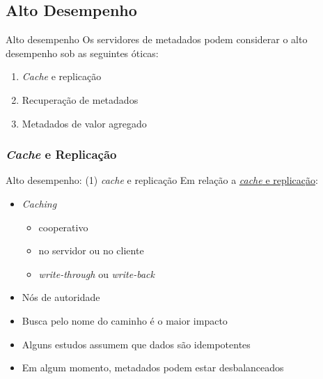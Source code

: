 \documentclass[xcolor=dvipsnames,table]{beamer}
\begin{document}
\subsection{Alto Desempenho}
\begin{frame}{Alto desempenho}
	Os servidores de metadados podem considerar o alto desempenho sob as seguintes óticas:
	\begin{enumerate}
		\item \textit{Cache} e replicação
		\item Recuperação de metadados
		\item Metadados de valor agregado
	\end{enumerate}
\end{frame}

\subsubsection{\textit{Cache} e Replicação}
\begin{frame}{Alto desempenho: (1) \textit{cache} e replicação}
	Em relação a \underline{\textit{cache} e replicação}:
	\begin{itemize}
		\item \textit{Caching}
		\begin{itemize}
			\item cooperativo
			\item no servidor ou no cliente
			\item \textit{write-through} ou \textit{write-back}
		\end{itemize}
		\item Nós de autoridade
		\item Busca pelo nome do caminho é o maior impacto
		\item Alguns estudos assumem que dados são idempotentes
		\item Em algum momento, metadados podem estar desbalanceados
	\end{itemize}
\end{frame}
\end{document}
